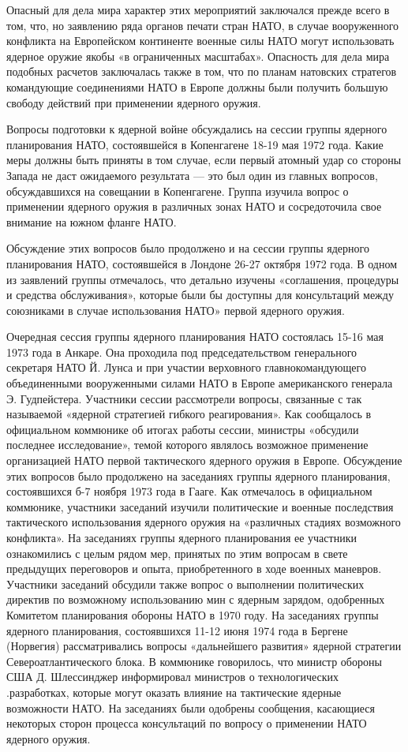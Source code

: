 \documentclass[12pt, a4paper, openany]{book}
\begin{document}
	Опасный для дела мира характер этих мероприятий заключался прежде всего в том, что, но заявлению ряда органов печати стран НАТО, в случае вооруженного конфликта на Европейском континенте военные силы НАТО могут использовать ядерное оружие якобы «в ограниченных масштабах». Опасность для дела мира подобных расчетов заключалась также в том, что по планам натовских стратегов командующие соединениями НАТО в Европе должны были получить большую свободу действий при применении ядерного оружия.
	
	Вопросы подготовки к ядерной войне обсуждались на сессии группы ядерного планирования НАТО, состоявшейся в Копенгагене 18-19 мая 1972 года. Какие меры должны быть приняты в том случае, если первый атомный удар со стороны Запада не даст ожидаемого результата — это был один из главных вопросов, обсуждавшихся на совещании в Копенгагене. Группа изучила вопрос о применении ядерного оружия в различных зонах НАТО и сосредоточила свое внимание на южном фланге НАТО.
	
	Обсуждение этих вопросов было продолжено и на сессии группы ядерного планирования НАТО, состоявшейся в Лондоне 26-27 октября 1972 года. В одном из заявлений группы отмечалось, что детально изучены «соглашения, процедуры и средства обслуживания», которые были бы доступны для консультаций между союзниками в случае использования НАТО» первой ядерного оружия.
	
	Очередная сессия группы ядерного планирования НАТО состоялась 15-16 мая 1973 года в Анкаре. Она проходила под председательством генерального секретаря НАТО Й. Лунса и при участии верховного главнокомандующего объединенными вооруженными силами НАТО в Европе американского генерала Э. Гудпейстера. Участники сессии рассмотрели вопросы, связанные с так называемой «ядерной стратегией гибкого реагирования». Как сообщалось в официальном коммюнике об итогах работы сессии, министры «обсудили последнее исследование», темой которого являлось возможное применение организацией НАТО первой тактического ядерного оружия в Европе. Обсуждение этих вопросов было продолжено на заседаниях группы ядерного планирования, состоявшихся б-7 ноября 1973 года в Гааге. Как отмечалось в официальном коммюнике, участники заседаний изучили политические и военные последствия тактического использования ядерного оружия на «различных стадиях возможного конфликта». На заседаниях группы ядерного планирования ее участники ознакомились с целым рядом мер, принятых по этим вопросам в свете предыдущих переговоров и опыта, приобретенного в ходе военных маневров. Участники заседаний обсудили также вопрос о выполнении политических директив по возможному использованию мин с ядерным зарядом, одобренных Комитетом планирования обороны НАТО в 1970 году. На заседаниях группы ядерного планирования, состоявшихся 11-12 июня 1974 года в Бергене (Норвегия) рассматривались вопросы «дальнейшего развития» ядерной стратегии Североатлантического блока. В коммюнике говорилось, что министр обороны США Д. Шлессинджер информировал министров о технологических .разработках, которые могут оказать влияние на тактические ядерные возможности НАТО. На заседаниях были одобрены сообщения, касающиеся некоторых сторон процесса консультаций по вопросу о применении НАТО ядерного оружия.
	
\end{document}
